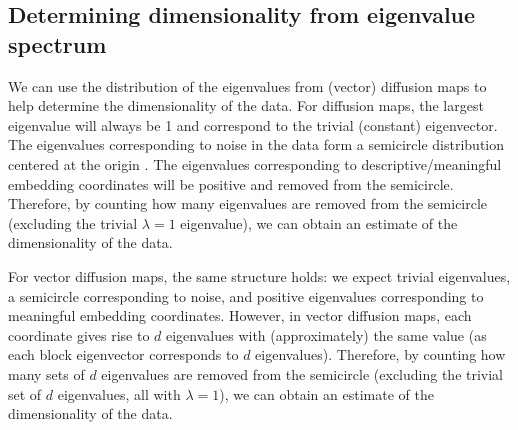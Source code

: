 \documentclass{pnastwo}
\begin{document}
\begin{article}
\subsection{Determining dimensionality from eigenvalue spectrum}

We can use the distribution of the eigenvalues from (vector) diffusion maps to help determine the dimensionality of the data.
%
For diffusion maps, the largest eigenvalue will always be 1 and correspond to the trivial (constant) eigenvector. 
%
The eigenvalues corresponding to noise in the data form a semicircle distribution centered at the origin \cite{wigner1955characteristic, wigner1958distribution}. 
%
The eigenvalues corresponding to descriptive/meaningful embedding coordinates will be positive and removed from the semicircle. 
%
Therefore, by counting how many eigenvalues are removed from the semicircle (excluding the trivial $\lambda=1$ eigenvalue), we can obtain an estimate of the dimensionality of the data.

For vector diffusion maps, the same structure holds: we expect trivial eigenvalues, a semicircle corresponding to noise, and positive eigenvalues corresponding to meaningful embedding coordinates.
%
However, in vector diffusion maps, each coordinate gives rise to $d$ eigenvalues with (approximately) the same value (as each block eigenvector corresponds to $d$ eigenvalues).
%
Therefore, by counting how many sets of $d$ eigenvalues are removed from the semicircle (excluding the trivial set of $d$ eigenvalues, all with  $\lambda=1$), we can obtain an estimate of the dimensionality of the data.


\end{article}
\end{document}
